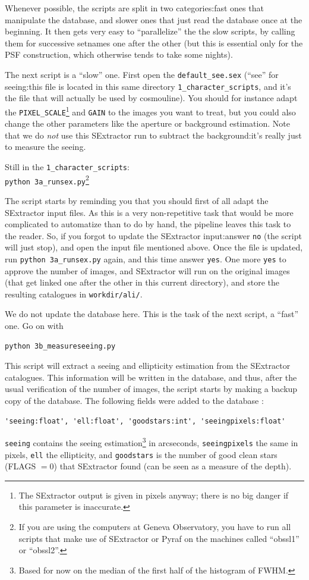 Whenever possible, the scripts are split in two categories:fast ones that manipulate the database, and slower ones that just read the database once at the beginning. It then gets very easy to ``parallelize'' the the slow scripts, by calling them for successive setnames one after the other (but this is essential only for the PSF construction, which otherwise tends to take some nights).

The next script is a ``slow'' one.
First open the \verb+default_see.sex+ (``see'' for seeing:this file is located in this same directory \verb+1_character_scripts+, and it's the file that will actually be used by cosmouline). You should for instance adapt the \verb+PIXEL_SCALE+\footnote{The SExtractor output is given in pixels anyway; there is no big danger if this parameter is inaccurate.} and \verb+GAIN+ to the images you want to treat, but you could also change the other parameters like the aperture or background estimation. Note that we do \emph{not} use this SExtractor run to subtract the background:it's really just to measure the seeing.

Still in the \verb+1_character_scripts+:\\
\verb+python 3a_runsex.py+\footnote{If you are using the computers at Geneva Observatory, you have to run all scripts that make use of SExtractor or Pyraf on the machines called ``obssl1'' or ``obssl2''. }


The script starts by reminding you that you should first of all adapt the SExtractor input files. As this is a very non-repetitive task that would be more complicated to automatize than to do by hand, the pipeline leaves this task to the reader. So, if you forgot to update the SExtractor input:answer \verb+no+ (the script will just stop), and open the input file mentioned above. 
Once the file is updated, run \verb+python 3a_runsex.py+ again, and this time answer \verb+yes+. One more \verb+yes+ to approve the number of images, and SExtractor will run on the original images (that get linked one after the other in this current directory), and store the resulting catalogues in \verb+workdir/ali/+.

We do not update the database here. This is the task of the next script, a ``fast'' one.
Go on with

\begin{Verbatim}
python 3b_measureseeing.py
\end{Verbatim}

This script will extract a seeing and ellipticity estimation from the SExtractor catalogues. This information will be written in the database, and thus, after the usual verification of the number of images, the script starts by making a backup copy of the database.
The following fields were added to the database :
\begin{Verbatim}
'seeing:float', 'ell:float', 'goodstars:int', 'seeingpixels:float'
\end{Verbatim}
\verb+seeing+ contains the seeing estimation\footnote{Based for now on the median of the first half of the histogram of FWHM.} in arcseconds, \verb+seeingpixels+ the same in pixels,  \verb+ell+ the ellipticity, and \verb+goodstars+ is the number of good clean stars (FLAGS $= 0$) that SExtractor found (can be seen as a measure of the depth).

